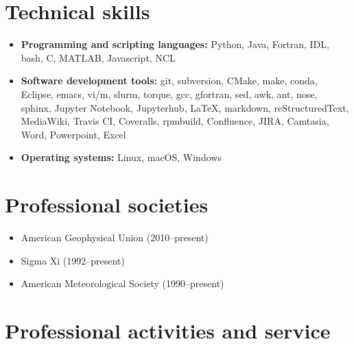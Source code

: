 \documentclass[letterpaper]{resume}
\begin{document}

\section{Technical skills}
\vspace{0.5em}

\begin{itemize}

  \item \textbf{Programming and scripting languages:}
    Python, Java, Fortran, IDL, bash, C, MATLAB, Javascript, NCL

  \item \textbf{Software development tools:}
    git, subversion, CMake, make, conda, Eclipse, emacs, vi/m, slurm,
    torque, gcc, gfortran, sed, awk, ant, nose, sphinx, Jupyter
    Notebook, Jupyterhub, \LaTeX, markdown, reStructuredText,
    MediaWiki, {Travis CI}, Coveralls, rpmbuild, Confluence, JIRA,
    Camtasia, Word, Powerpoint, Excel

  \item \textbf{Operating systems:}
    Linux, macOS, Windows

\end{itemize}


\section{Professional societies}
\vspace{0.5em}

\begin{itemize}
  \item American Geophysical Union (2010--present) 
  \item Sigma Xi (1992--present)
  \item American Meteorological Society (1990--present)
\end{itemize}


\section{Professional activities and service}
\vspace{0.5em}
\end{document}
